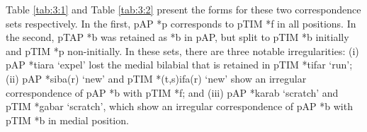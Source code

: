 Table \ref{tab:3:1} and Table \ref{tab:3:2} present the forms for these two correspondence sets respectively. In the first, pAP *p corresponds to pTIM *f in all positions. In the second, pTAP *b was retained as *b in pAP, but split to pTIM *b initially and pTIM *p non-initially. In these sets, there are three notable irregularities: (i) pAP *tiara `expel' lost the medial bilabial that is retained in pTIM *tifar `run'; (ii) pAP *siba(r) `new' and pTIM *(t,s)ifa(r) `new' show an irregular correspondence of pAP *b with pTIM *f; and (iii) pAP *karab `scratch' and pTIM *gabar `scratch', which show an irregular correspondence of pAP *b with pTIM *b in medial position. 
 


